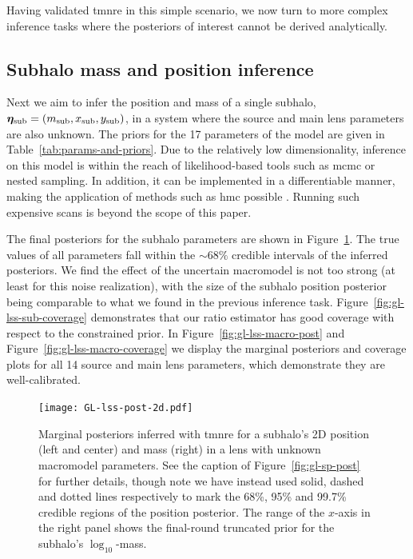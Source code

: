 Having validated \gls*{tmnre} in this simple scenario, we now turn to more complex inference tasks where the posteriors of interest cannot be derived analytically.

\subsection{Subhalo mass and position inference}\label{subsec:lss}

Next we aim to infer the position and mass of a single subhalo, ${{\bm{\eta}}}_\mathrm{sub} = (m_\mathrm{sub}, x_\mathrm{sub}, y_\mathrm{sub})$, in a system where the source and main lens parameters are also unknown. The priors for the \num{17} parameters of the model are given in Table~\ref{tab:params-and-priors}. Due to the relatively low dimensionality, inference on this model is within the reach of likelihood-based tools such as \gls*{mcmc} or nested sampling. In addition, it can be implemented in a differentiable manner, making the application of methods such as \gls*{hmc} possible \citep{Gu:2022xhk,Chianese:2019ifk}. Running such expensive scans is beyond the scope of this paper.

The final posteriors for the subhalo parameters are shown in Figure~\ref{fig:gl-lss-sub-post}. The true values of all parameters fall within the $\sim 68\%$ credible intervals of the inferred posteriors. We find the effect of the uncertain macromodel is not too strong (at least for this noise realization), with the size of the subhalo position posterior being comparable to what we found in the previous inference task.
Figure~\ref{fig:gl-lss-sub-coverage} demonstrates that our ratio estimator has good coverage with respect to the constrained prior. In Figure~\ref{fig:gl-lss-macro-post} and Figure~\ref{fig:gl-lss-macro-coverage} we display the marginal posteriors and coverage plots for all 14 source and main lens parameters, which demonstrate they are well-calibrated.

\begin{figure}
    \centering
    \texttt{[image: GL-lss-post-2d.pdf]} %
    \caption{Marginal posteriors inferred with \gls*{tmnre} for a subhalo's 2D position (left and center) and mass (right) in a lens with unknown macromodel parameters. See the caption of Figure~\ref{fig:gl-sp-post} for further details, though note we have instead used solid, dashed and dotted lines respectively to mark the 68\%, 95\% and 99.7\% credible regions of the position posterior. The range of the $x$-axis in the right panel shows the final-round truncated prior for the subhalo's $\log_{10}$-mass.}
    \label{fig:gl-lss-sub-post}
\end{figure}


